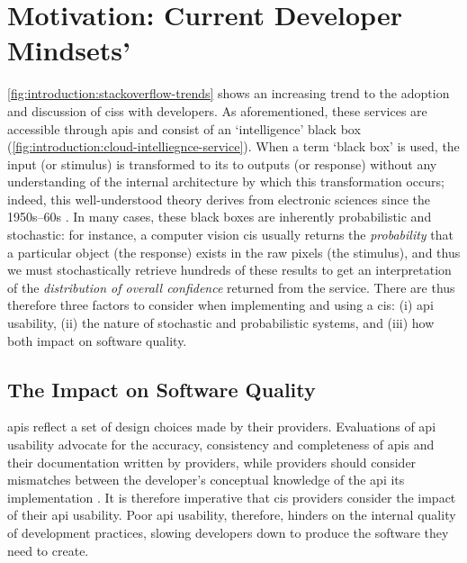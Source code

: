\section{Motivation: Current Developer Mindsets'}

\cref{fig:introduction:stackoverflow-trends} shows an increasing trend to the adoption and discussion of \glspl{cis} with developers. As aforementioned, these services are accessible through \glspl{api} and consist of an `intelligence' black box (\cref{fig:introduction:cloud-intelliegnce-service}). When a term `black box' is used, the input (or stimulus) is transformed to its to outputs (or response) without any understanding of the internal architecture by which this transformation occurs; indeed, this well-understood theory derives from electronic sciences since the 1950s--60s . In many cases, these black boxes are inherently probabilistic and stochastic: for instance, a computer vision \gls{cis} usually returns the \textit{probability} that a particular object (the response) exists in the raw pixels (the stimulus), and thus we must stochastically retrieve hundreds of these results to get an interpretation of the \textit{distribution of overall confidence} returned from the service. There are thus therefore three factors to consider when implementing and using a \gls{cis}: (i) \gls{api} usability, (ii) the nature of stochastic and probabilistic systems, and (iii) how both impact on software quality.

\subsection{The Impact on Software Quality}

\glspl{api} reflect a set of design choices made by their providers. Evaluations of \gls{api} usability advocate for the accuracy, consistency and completeness of \glspl{api} and their documentation \citep{Piccioni:2013em,Robillard:2009uk} written by providers, while providers should consider mismatches between the developer's conceptual knowledge of the \gls{api} its implementation \citep{Ko:2011fb}. It is therefore imperative that \gls{cis} providers consider the impact of their \gls{api} usability. Poor \gls{api} usability, therefore, hinders on the internal quality of development practices, slowing developers down to produce the software they need to create.

